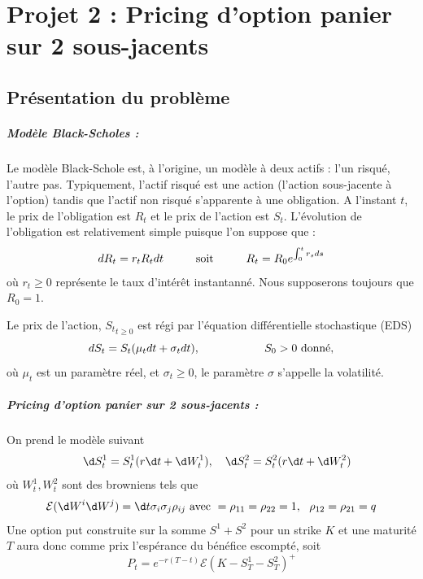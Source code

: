 \documentclass{book}
\begin{document}
\chapter{Projet 2 : Pricing d'option panier sur 2 sous-jacents}
\section{Présentation du problème}
\paragraph{Modèle Black-Scholes : }
Le modèle Black-Schole est, à l'origine, un modèle à deux actifs : l'un risqué, l'autre pas. Typiquement, l'actif risqué est une action (l'action sous-jacente à l'option) tandis que l'actif non risqué s'apparente à une obligation. A l'instant $t$, le prix de l'obligation est $R_t$ et le prix de l'action est $S_t$. L'évolution de l'obligation est relativement simple puisque l'on suppose que :
\[
dR_t = r_tR_tdt \hspace{1cm} \hbox{soit} \hspace{1cm} R_t=R_0e^{\int_0^tr_sds}
\]
où $r_t\geq0$ représente le taux d'intérêt instantanné. Nous supposerons toujours que $R_0=1$.

Le prix de l'action, ${S_t}_{t\geq0}$ est régi par l'équation différentielle stochastique (EDS)
\[
dS_t=S_t(\mu_tdt +\sigma_tdt), \hspace{2cm} S_0\\>0\hbox{ donné,}
\]
où $\mu_t$ est un paramètre réel, et $\sigma_t\geq0$, le paramètre $\sigma$ s'appelle la volatilité.

\paragraph{Pricing d'option panier sur 2 sous-jacents : }
On prend le mod{\`e}le suivant
\begin{eqnarray}&&
    \d S^1_t = S^1_t(r\d t + \d W^1_t ),
~~~%
    \d S^2_t = S^2_t(r\d t + \d W^2_t )
\end{eqnarray}
o{\`u} $W^1_t,W^2_t$ sont des browniens tels que
\[
    {\mathcal E}(\d W^i\d W^j) = \d t \sigma_i\sigma_j\rho_{ij}
    \hbox{ avec } =\rho_{11}=\rho_{22}=1,~~\rho_{12}=\rho_{21}=q
\]
Une option put construite sur la somme $S^1+S^2$ pour un strike $K$ et une maturit{\'e} $T$ aura donc comme prix l'esp{\'e}rance du
b{\'e}n{\'e}fice escompt{\'e}, soit
\[
    P_t = e^{-r(T-t)}{\mathcal E}(K-S^1_T-S^2_T)^+
\]
\end{document}
